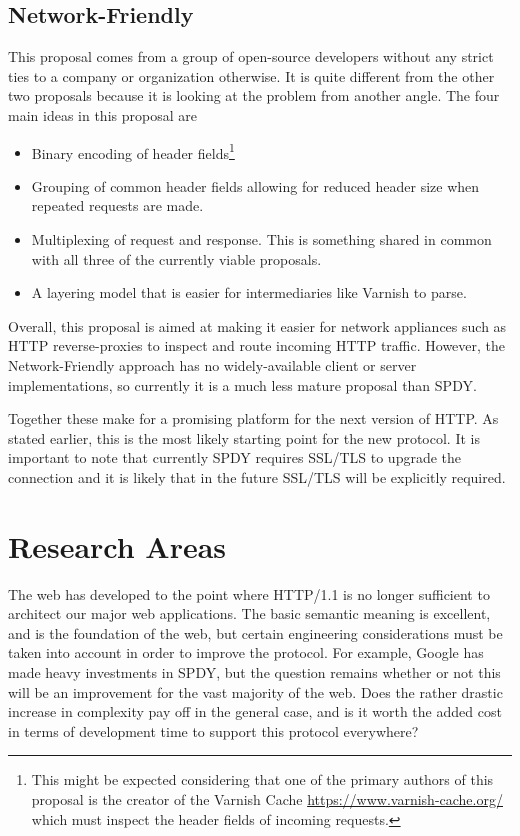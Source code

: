\documentclass[10pt,letterpaper,notitlepage]{article}
\begin{document}
\subsection{Network-Friendly}
\label{sec:background/opensource}
This proposal comes from a group of open-source developers without any strict
ties to a company or organization otherwise.  It is quite different from the
other two proposals because it is looking at the problem from another angle.
The four main ideas in this proposal are~\cite{friendly}
\begin{itemize}
\item Binary encoding of header fields\footnote{This might be expected
considering that one of the primary authors of this proposal is the creator of
the Varnish Cache \url{https://www.varnish-cache.org/} which must inspect the
header fields of incoming requests.}
\item Grouping of common header fields allowing for reduced header size when
repeated requests are made.
\item Multiplexing of request and response.  This is something shared in common
with all three of the currently viable proposals.
\item A layering model that is easier for intermediaries like Varnish to parse.
\end{itemize}

Overall, this proposal is aimed at making it easier for network appliances such
as HTTP reverse-proxies to inspect and route incoming HTTP traffic. However,
the Network-Friendly approach has no widely-available client or server
implementations, so currently it is a much less mature proposal than SPDY.

Together these make for a promising platform for the next version of HTTP.  As
stated earlier, this is the most likely starting point for the new protocol. It
is important to note that currently SPDY requires SSL/TLS to upgrade the
connection and it is likely that in the future SSL/TLS will be explicitly
required.

\section{Research Areas}
\label{sec:research}
The web has developed to the point where HTTP/1.1 is no longer sufficient to
architect our major web applications. The basic semantic meaning is excellent,
and is the foundation of the web, but certain engineering considerations must
be taken into account in order to improve the protocol. For example, Google has
made heavy investments in SPDY, but the question remains whether or not this
will be an improvement for the vast majority of the web.  Does the rather
drastic increase in complexity pay off in the general case, and is it worth the
added cost in terms of development time to support this protocol everywhere?
\end{document}
